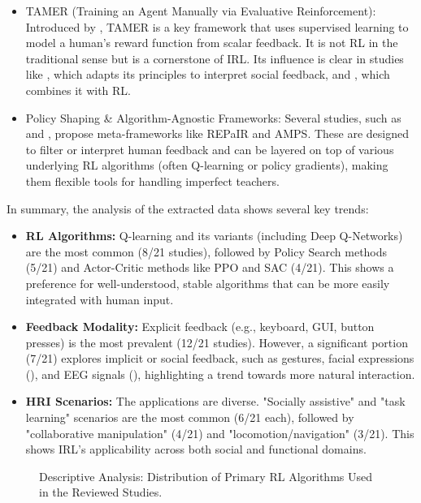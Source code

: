 \documentclass[rnd]{mas_proposal}
\begin{document}
\begin{itemize}
    \item TAMER (Training an Agent Manually via Evaluative Reinforcement): Introduced by \citet{BradleyKnox2008}, TAMER is a key framework that uses supervised learning to model a human's reward function from scalar feedback. It is not RL in the traditional sense but is a cornerstone of IRL. Its influence is clear in studies like \citet{Lin2020a}, which adapts its principles to interpret social feedback, and \citet{Faulkner2020}, which combines it with RL.
    \item Policy Shaping \& Algorithm-Agnostic Frameworks: Several studies, such as \citet{Faulkner2020} and \citet{KesslerFaulkner2021}, propose meta-frameworks like REPaIR and AMPS. These are designed to filter or interpret human feedback and can be layered on top of various underlying RL algorithms (often Q-learning or policy gradients), making them flexible tools for handling imperfect teachers.
\end{itemize}

\noindent
In summary, the analysis of the extracted data shows several key trends:
\begin{itemize}
    \item \textbf{RL Algorithms:} Q-learning and its variants (including Deep Q-Networks) are the most common (8/21 studies), followed by Policy Search methods (5/21) and Actor-Critic methods like PPO and SAC (4/21). This shows a preference for well-understood, stable algorithms that can be more easily integrated with human input.
    \item \textbf{Feedback Modality:} Explicit feedback (e.g., keyboard, GUI, button presses) is the most prevalent (12/21 studies). However, a significant portion (7/21) explores implicit or social feedback, such as gestures, facial expressions (\citet{Lin2020a}), and EEG signals (\citet{Xu2021}), highlighting a trend towards more natural interaction.
    \item \textbf{HRI Scenarios:} The applications are diverse. "Socially assistive" and "task learning" scenarios are the most common (6/21 each), followed by "collaborative manipulation" (4/21) and "locomotion/navigation" (3/21). This shows IRL's applicability across both social and functional domains.
\end{itemize}

\begin{figure}[h!]
\centering
\caption{Descriptive Analysis: Distribution of Primary RL Algorithms Used in the Reviewed Studies.}
\label{fig:alg_dist}
\end{figure}
\end{document}

